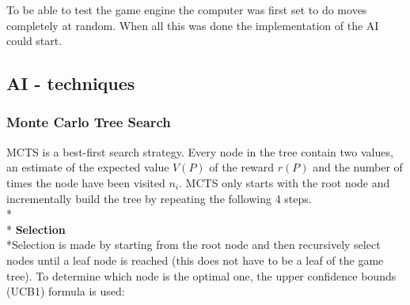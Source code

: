 \documentclass[journal]{vgtc}                %
\begin{document}
To be able to test the game engine the computer was first set to do moves completely  at random. When all this was done the implementation of the AI could start.

\subsection{AI - techniques}
\subsubsection{Monte Carlo Tree Search}
MCTS is a best-first search strategy. Every node in the tree contain two values, an estimate of the expected value $V(P)$ of the reward $r(P)$ and the number of times the node have been visited $n_{i}$. MCTS only starts with the root node and incrementally build the tree by repeating the following 4 steps.\\*\\*
\textbf{Selection}
\\*Selection is made by starting from the root node and then recursively select nodes until a leaf node is reached (this does not have to be a leaf of the game tree). To determine which node is the optimal one, the upper confidence bounds (UCB1) formula is used: 
\end{document}
